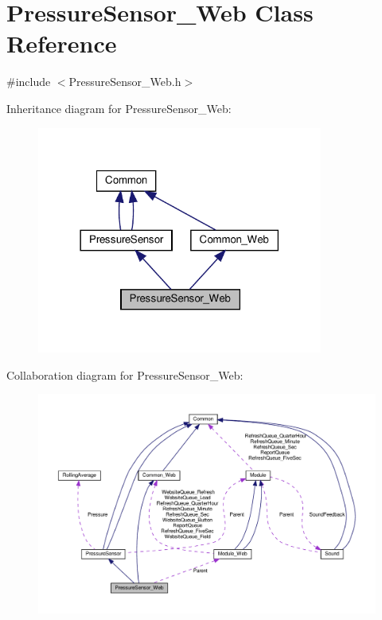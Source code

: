 \hypertarget{class_pressure_sensor___web}{}\section{Pressure\+Sensor\+\_\+\+Web Class Reference}
\label{class_pressure_sensor___web}


{\ttfamily \#include $<$Pressure\+Sensor\+\_\+\+Web.\+h$>$}



Inheritance diagram for Pressure\+Sensor\+\_\+\+Web\+:
\nopagebreak
\begin{figure}[H]
\begin{center}
\leavevmode
\includegraphics[width=266pt]{class_pressure_sensor___web__inherit__graph}
\end{center}
\end{figure}


Collaboration diagram for Pressure\+Sensor\+\_\+\+Web\+:
\nopagebreak
\begin{figure}[H]
\begin{center}
\leavevmode
\includegraphics[width=350pt]{class_pressure_sensor___web__coll__graph}
\end{center}
\end{figure}
